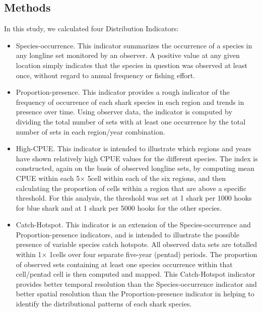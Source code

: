 \documentclass[12pt]{SCreport}
\begin{document}
      
      \subsection{Methods}
      In this study, we calculated four Distribution Indicators:
      
\begin{itemize}
\item	Species-occurrence.  This indicator summarizes the occurrence of a species in any longline set monitored by an observer.  A positive value at any given location simply indicates that the species in question was observed at least once, without regard to annual frequency or fishing effort.

\item	Proportion-presence.  This indicator provides a rough indicator of the frequency of occurrence of each shark species in each region and trends in presence over time.  Using observer data, the indicator is computed by dividing the total number of sets with at least one occurrence by the total number of sets in each region/year combination.
\item	High-CPUE.  This indicator is intended to illustrate which regions and years have shown relatively high CPUE values for the different species.  The index is constructed, again on the basis of observed longline sets, by computing mean CPUE within each 5\degree $\times$ 5\degree cell within each of the six regions, and then calculating the proportion of cells within a region that are above a specific threshold.  For this analysis, the threshold was set at 1 shark per 1000 hooks for blue shark and at 1 shark per 5000 hooks for the other species.
\item	Catch-Hotspot.  This indicator is an extension of the Species-occurrence and Proportion-presence indicators, and is intended to illustrate the possible presence of variable species catch hotspots.  All observed data sets are totalled within 1\degree $\times$ 1\degree cells over four separate five-year (pentad) periods.  The proportion of observed sets containing at least one species occurrence within that cell/pentad cell is then computed and mapped.  This Catch-Hotspot indicator provides better temporal resolution than the Species-occurrence indicator and better spatial resolution than the Proportion-presence indicator in helping to identify the distributional patterns of each shark species.
\end{itemize}
\end{document}

